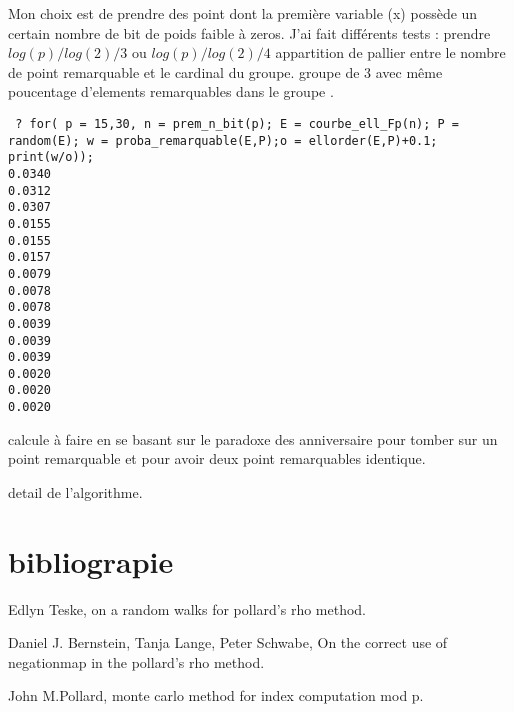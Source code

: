\documentclass[a4paper,10pt]{report}
\begin{document}
Mon choix est de prendre des point dont la première variable (x) possède un certain nombre de bit de poids faible à zeros.
J'ai fait différents tests : prendre $log(p)/log(2)/3$ ou $log(p)/log(2)/4$ appartition de pallier entre le nombre de point remarquable et le cardinal du groupe.
groupe de 3 avec même poucentage d'elements remarquables dans le groupe .
\begin{verbatim}
 ? for( p = 15,30, n = prem_n_bit(p); E = courbe_ell_Fp(n); P = random(E); w = proba_remarquable(E,P);o = ellorder(E,P)+0.1; print(w/o));
0.0340
0.0312
0.0307
0.0155
0.0155
0.0157
0.0079
0.0078
0.0078
0.0039
0.0039
0.0039
0.0020
0.0020
0.0020

\end{verbatim}



calcule à faire en se basant sur le paradoxe des anniversaire pour tomber sur un point remarquable et pour avoir deux point remarquables identique.

detail de l'algorithme.

\chapter{bibliograpie}
Edlyn Teske, on a random walks for pollard's rho method.

Daniel J. Bernstein, Tanja Lange, Peter Schwabe, On the correct use of negationmap in the pollard's rho method.

John M.Pollard, monte carlo method for index computation mod p.
\end{document}
